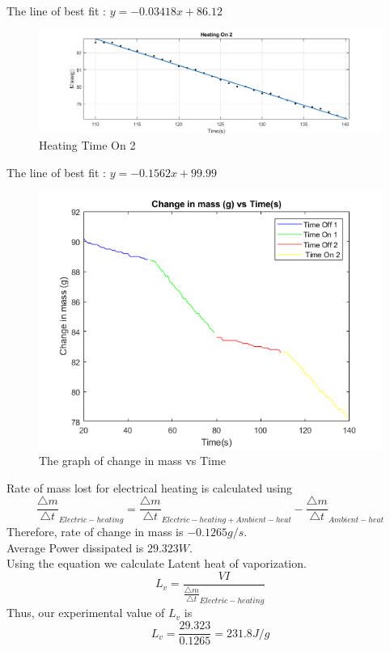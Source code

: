 The line of best fit : $ y = -0.03418x + 86.12$ \\
\newpage
\begin{figure}[h!]
    \centering
    \includegraphics[width=\textwidth]{figures/TimeOn2_C.png}
    \caption{Heating Time On 2}
    \label{fig:yx}
\end{figure}
The line of best fit : $ y = -0.1562x + 99.99$ \\
\newpage
\begin{figure}[h!]
    \centering
    \includegraphics[width=\textwidth]{figures/Final.png}
    \caption{The graph of change in mass vs Time}
    \label{fig:yx}
\end{figure}

Rate of mass lost for electrical heating is calculated using 
\begin{equation}
    \frac{\triangle m}{\triangle t}_{Electric-heating} = \frac{\triangle m}{\triangle t}_{Electric-heating + Ambient-heat} - \frac{\triangle m}{\triangle t}_{Ambient-heat}
\end{equation} 
Therefore, rate of change in mass  is $-0.1265 g/s$. \\ 
Average Power dissipated is $29.323W$. \\
Using the equation we calculate Latent heat of vaporization. 
\begin{equation}
    L_v= \frac{VI}{\frac{\triangle m}{\triangle t}_{Electric-heating}}
\end{equation} 
Thus, our experimental value of $L_v$ is 
\begin{equation}
    L_v= \frac{29.323}{0.1265} = 231.8 J/g 
\end{equation} 
\newpage

